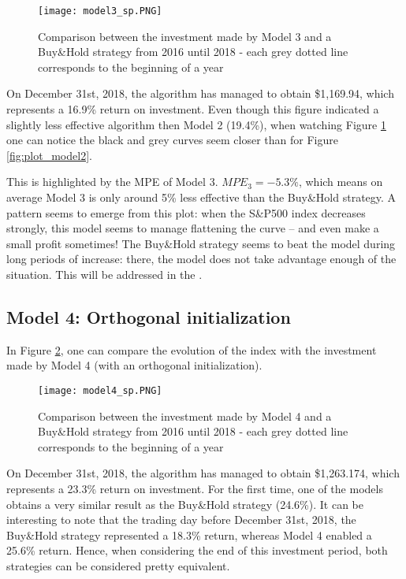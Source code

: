 \documentclass[11pt]{article}
\begin{document}
\begin{onehalfspace}
\begin{figure}[h!]
    \centering
    \texttt{[image: model3\_sp.PNG]}
    \caption{Comparison between the investment made by Model 3 and a Buy\&Hold strategy from 2016 until 2018 - each grey dotted line corresponds to the beginning of a year}
\label{fig:plot_model3}
\end{figure}

On December 31st, 2018, the algorithm has managed to obtain \$1,169.94, which represents a 16.9\% return on investment. Even though this figure indicated a slightly less effective algorithm then Model 2 (19.4\%), when watching Figure \ref{fig:plot_model3} one can notice the black and grey curves seem closer than for Figure \ref{fig:plot_model2}.

This is highlighted by the MPE of Model 3. $MPE_3 = -5.3\%$, which means on average Model 3 is only around 5\% less effective than the Buy\&Hold strategy. A pattern seems to emerge from this plot: when the S\&P500 index decreases strongly, this model seems to manage flattening the curve -- and even make a small profit sometimes! The Buy\&Hold strategy seems to beat the model during long periods of increase: there, the model does not take advantage enough of the situation. This will be addressed in the .

\subsection{Model 4: Orthogonal initialization}

In Figure \ref{fig:plot_model4}, one can compare the evolution of the index with the investment made by Model 4 (with an orthogonal initialization).

\begin{figure}[h!]
    \centering
    \texttt{[image: model4\_sp.PNG]}
    \caption{Comparison between the investment made by Model 4 and a Buy\&Hold strategy from 2016 until 2018 - each grey dotted line corresponds to the beginning of a year}
\label{fig:plot_model4}
\end{figure}

On December 31st, 2018, the algorithm has managed to obtain \$1,263.174, which represents a 23.3\% return on investment. For the first time, one of the models obtains a very similar result as the Buy\&Hold strategy (24.6\%). It can be interesting to note that the trading day before December 31st, 2018, the Buy\&Hold strategy represented a 18.3\% return, whereas Model 4 enabled a 25.6\% return. Hence, when considering the end of this investment period, both strategies can be considered pretty equivalent.


\end{onehalfspace}
\end{document}
